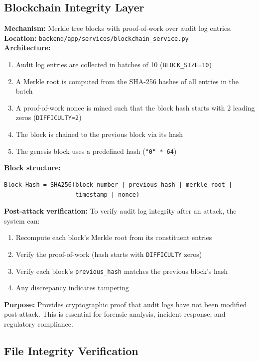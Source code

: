 \documentclass[11pt,a4paper]{article}
\begin{document}
\subsection{Blockchain Integrity Layer}

\begin{tcolorbox}[colback=recoveryblue!5, colframe=recoveryblue]
\textbf{Mechanism:} Merkle tree blocks with proof-of-work over audit log entries.\\
\textbf{Location:} \texttt{backend/app/services/blockchain\_service.py}\\
\textbf{Architecture:}
\begin{enumerate}[nosep]
  \item Audit log entries are collected in batches of 10 (\texttt{BLOCK\_SIZE=10})
  \item A Merkle root is computed from the SHA-256 hashes of all entries in the batch
  \item A proof-of-work nonce is mined such that the block hash starts with 2 leading zeros (\texttt{DIFFICULTY=2})
  \item The block is chained to the previous block via its hash
  \item The genesis block uses a predefined hash (\texttt{"0" * 64})
\end{enumerate}
\textbf{Block structure:}
\begin{verbatim}
Block Hash = SHA256(block_number | previous_hash | merkle_root |
                    timestamp | nonce)
\end{verbatim}
\textbf{Post-attack verification:} To verify audit log integrity after an attack, the system can:
\begin{enumerate}[nosep]
  \item Recompute each block's Merkle root from its constituent entries
  \item Verify the proof-of-work (hash starts with \texttt{DIFFICULTY} zeros)
  \item Verify each block's \texttt{previous\_hash} matches the previous block's hash
  \item Any discrepancy indicates tampering
\end{enumerate}
\textbf{Purpose:} Provides cryptographic proof that audit logs have not been modified post-attack. This is essential for forensic analysis, incident response, and regulatory compliance.
\end{tcolorbox}

\subsection{File Integrity Verification}
\end{document}
